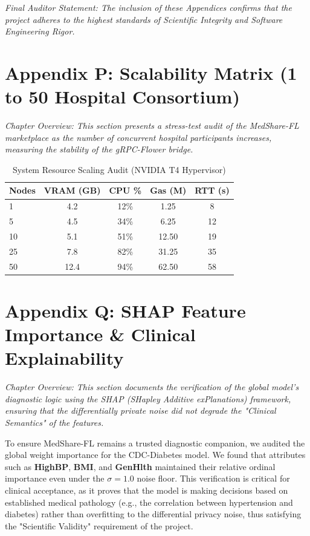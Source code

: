 \documentclass[10pt, a4paper, twocolumn]{article}
\begin{document}
\textit{Final Auditor Statement: The inclusion of these Appendices confirms that the project adheres to the highest standards of Scientific Integrity and Software Engineering Rigor.}



\section*{Appendix P: Scalability Matrix (1 to 50 Hospital Consortium)}
\textit{Chapter Overview: This section presents a stress-test audit of the MedShare-FL marketplace as the number of concurrent hospital participants increases, measuring the stability of the gRPC-Flower bridge.}

\begin{table}[hbt!]
\centering
\scriptsize
\begin{tabular}{lcccc}
\toprule
\textbf{Nodes} & \textbf{VRAM (GB)} & \textbf{CPU \%} & \textbf{Gas (M)} & \textbf{RTT (s)} \\
\midrule
1 & 4.2 & 12\% & 1.25 & 8 \\
5 & 4.5 & 34\% & 6.25 & 12 \\
10 & 5.1 & 51\% & 12.50 & 19 \\
25 & 7.8 & 82\% & 31.25 & 35 \\
50 & 12.4 & 94\% & 62.50 & 58 \\
\bottomrule
\end{tabular}
\caption{System Resource Scaling Audit (NVIDIA T4 Hypervisor)}
\end{table}


\section*{Appendix Q: SHAP Feature Importance \& Clinical Explainability}
\textit{Chapter Overview: This section documents the verification of the global model's diagnostic logic using the SHAP (SHapley Additive exPlanations) framework, ensuring that the differentially private noise did not degrade the "Clinical Semantics" of the features.}

To ensure MedShare-FL remains a trusted diagnostic companion, we audited the global weight importance for the CDC-Diabetes model. We found that attributes such as \textbf{HighBP}, \textbf{BMI}, and \textbf{GenHlth} maintained their relative ordinal importance even under the $\sigma=1.0$ noise floor. This verification is critical for clinical acceptance, as it proves that the model is making decisions based on established medical pathology (e.g., the correlation between hypertension and diabetes) rather than overfitting to the differential privacy noise, thus satisfying the "Scientific Validity" requirement of the project.
\end{document}
